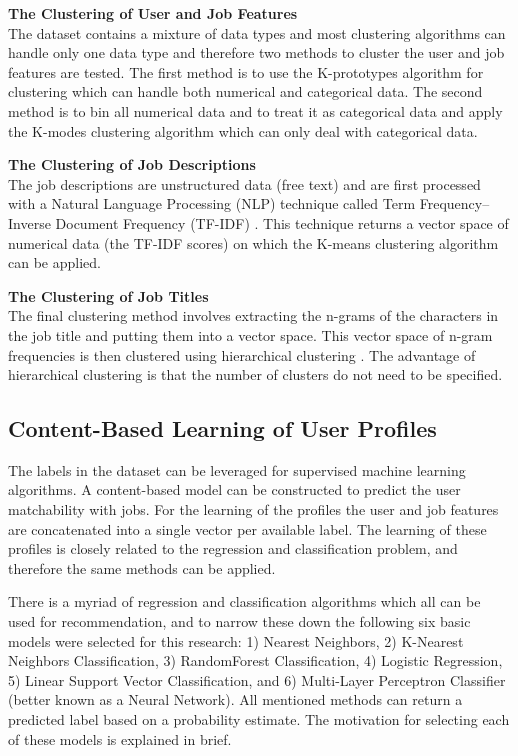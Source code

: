 \noindent
\textbf{The Clustering of User and Job Features} \\
The dataset contains a mixture of data types and most clustering algorithms can handle only one data type and therefore two methods to cluster the user and job features are tested.
The first method is to use the K-prototypes algorithm \cite{huang1997clustering} for clustering which can handle both numerical and categorical data. 
The second method is to bin all numerical data and to treat it as categorical data and apply the K-modes clustering algorithm \cite{huang1997clustering, huang1998extensions} which can only deal with categorical data. 

\noindent
\textbf{The Clustering of Job Descriptions} \\
The job descriptions are unstructured data (free text) and are first processed with a Natural Language Processing (NLP) technique called Term Frequency–Inverse Document Frequency (TF-IDF) \cite{ramos2003using}. 
This technique returns a vector space of numerical data (the TF-IDF scores) on which the K-means clustering algorithm \cite{hartigan1979algorithm} can be applied. 

\noindent
\textbf{The Clustering of Job Titles} \\
The final clustering method involves extracting the n-grams of the characters in the job title and putting them into a vector space.
This vector space of n-gram frequencies is then clustered using hierarchical clustering \cite{rokach2005clustering}. 
The advantage of hierarchical clustering is that the number of clusters do not need to be specified. 

\subsection{Content-Based Learning of User Profiles} 
\label{ssec:cblup}
The labels in the dataset can be leveraged for supervised machine learning algorithms. 
A content-based model can be constructed to predict the user matchability with jobs. 
For the learning of the profiles the user and job features are concatenated into a single vector per available label. 
The learning of these profiles is closely related to the regression and classification problem, and therefore the same methods can be applied. 

There is a myriad of regression and classification algorithms which all can be used for recommendation, and to narrow these down the following six basic models were selected for this research: 1) Nearest Neighbors, 2) K-Nearest Neighbors Classification, 3) RandomForest Classification, 4) Logistic Regression, 5) Linear Support Vector Classification, and 6) Multi-Layer Perceptron Classifier (better known as a Neural Network).
All mentioned methods can return a predicted label based on a probability estimate.
The motivation for selecting each of these models is explained in brief.

